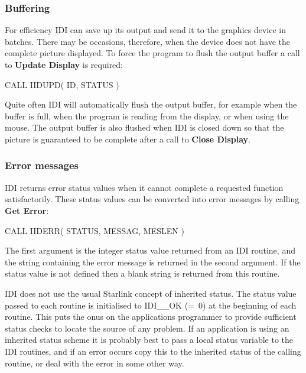\documentclass[11pt,nolof]{starlink}
\begin{document}
\subsubsection{Buffering}

For efficiency IDI can save up its output and send it to the graphics
device in batches. There may be occasions, therefore, when the device does
not have the complete picture displayed. To force the program to flush the
output buffer a call to \textbf{Update Display} is required:
\begin{small}
\begin{terminalv}
      CALL IIDUPD( ID, STATUS )
\end{terminalv}
\end{small}

Quite often IDI will automatically flush the output buffer, for example
when the buffer is full, when the program is reading from the display,
or when using the mouse. The output buffer is also flushed when IDI is closed
down so that the picture is guaranteed to be complete after a call to
\textbf{Close Display}.

\subsubsection{Error messages}

IDI returns error status values when it cannot complete a requested
function satisfactorily. These status values can be converted into
error messages by calling \textbf{Get Error}:
\begin{small}
\begin{terminalv}
      CALL IIDERR( STATUS, MESSAG, MESLEN )
\end{terminalv}
\end{small}
The first argument is the integer status value returned from an IDI
routine, and the string containing the error message is returned in
the second argument. If the status value is not defined then a blank
string is returned from this routine.

IDI does not use the usual Starlink concept of inherited status. The
status value passed to each routine is initialised to IDI\_\_OK (=~0)
at the beginning of each routine. This puts the onus on the applications
programmer to provide sufficient status checks to locate the source of
any problem. If an application is using an
inherited status scheme it is probably best to pass a local status
variable to the IDI routines, and if an error occurs copy this to the
inherited status of the calling routine, or deal with the error in some
other way.
\end{document}

